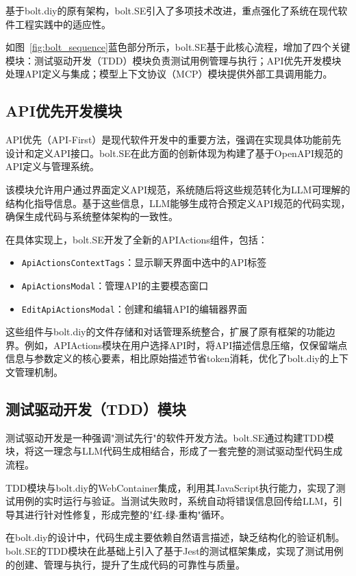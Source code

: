 基于bolt.diy的原有架构，bolt.SE引入了多项技术改进，重点强化了系统在现代软件工程实践中的适应性。

如图~\ref{fig:bolt_sequence}蓝色部分所示，bolt.SE基于此核心流程，增加了四个关键模块：测试驱动开发（TDD）模块负责测试用例管理与执行；API优先开发模块处理API定义与集成；模型上下文协议（MCP）模块提供外部工具调用能力。

\subsection{API优先开发模块}
API优先（API-First）是现代软件开发中的重要方法，强调在实现具体功能前先设计和定义API接口。bolt.SE在此方面的创新体现为构建了基于OpenAPI规范的API定义与管理系统。

该模块允许用户通过界面定义API规范，系统随后将这些规范转化为LLM可理解的结构化指导信息。基于这些信息，LLM能够生成符合预定义API规范的代码实现，确保生成代码与系统整体架构的一致性。

在具体实现上，bolt.SE开发了全新的APIActions组件，包括：
\begin{itemize}
  \item \texttt{ApiActionsContextTags}：显示聊天界面中选中的API标签
  \item \texttt{ApiActionsModal}：管理API的主要模态窗口
  \item \texttt{EditApiActionsModal}：创建和编辑API的编辑器界面
\end{itemize}

这些组件与bolt.diy的文件存储和对话管理系统整合，扩展了原有框架的功能边界。例如，APIActions模块在用户选择API时，将API描述信息压缩，仅保留端点信息与参数定义的核心要素，相比原始描述节省token消耗，优化了bolt.diy的上下文管理机制。

\subsection{测试驱动开发（TDD）模块}

测试驱动开发是一种强调"测试先行"的软件开发方法。bolt.SE通过构建TDD模块，将这一理念与LLM代码生成相结合，形成了一套完整的测试驱动型代码生成流程。

TDD模块与bolt.diy的WebContainer集成，利用其JavaScript执行能力，实现了测试用例的实时运行与验证。当测试失败时，系统自动将错误信息回传给LLM，引导其进行针对性修复，形成完整的"红-绿-重构"循环。

在bolt.diy的设计中，代码生成主要依赖自然语言描述，缺乏结构化的验证机制。bolt.SE的TDD模块在此基础上引入了基于Jest的测试框架集成，实现了测试用例的创建、管理与执行，提升了生成代码的可靠性与质量。

